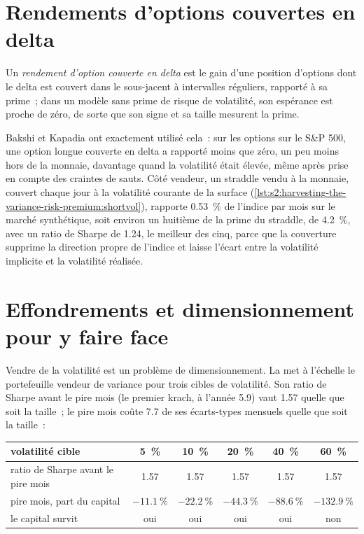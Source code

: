 \section{Rendements d'options couvertes en delta}

\begin{definition}\label{def:s2:harvesting-the-variance-risk-premium:hedged}
Un \emph{rendement d'option couverte en delta} est le gain d'une position d'options dont le delta est couvert dans le sous-jacent à
intervalles réguliers, rapporté à sa prime~; dans un modèle sans prime de risque de volatilité, son espérance est proche de zéro, de sorte que son signe et sa taille mesurent
la prime.
\end{definition}

Bakshi et Kapadia ont exactement utilisé cela~: sur les options sur le S\&P 500, une option longue couverte en delta a rapporté moins que zéro, un peu moins hors de la monnaie, davantage quand
la volatilité était élevée, même après prise en compte des craintes de sauts. Côté vendeur, un straddle vendu à la monnaie, couvert chaque jour à la volatilité
courante de la surface (\cref{lst:s2:harvesting-the-variance-risk-premium:shortvol}), rapporte 0.53~\% de l'indice par mois sur le marché synthétique, soit environ un huitième de la
prime du straddle, de 4.2~\%, avec un ratio de Sharpe de 1.24, le meilleur des cinq, parce que la couverture supprime la direction propre de l'indice et laisse l'écart entre
la volatilité implicite et la volatilité réalisée.

\section{Effondrements et dimensionnement pour y faire face}

Vendre de la volatilité est un problème de dimensionnement. La  met à l'échelle le portefeuille vendeur de variance pour trois cibles de
volatilité. Son ratio de Sharpe avant le pire mois (le premier krach, à l'année 5.9) vaut 1.57 quelle que soit la taille~; le pire mois coûte 7.7 de ses écarts-types
mensuels quelle que soit la taille~:

\begin{center}
\small
\begin{tabular}{@{}lccccc@{}}
\toprule
volatilité cible & 5~\% & 10~\% & 20~\% & 40~\% & 60~\%\\
\midrule
ratio de Sharpe avant le pire mois & 1.57 & 1.57 & 1.57 & 1.57 & 1.57\\
pire mois, part du capital & $-11.1~\%$ & $-22.2~\%$ & $-44.3~\%$ & $-88.6~\%$ & $-132.9~\%$\\
le capital survit & oui & oui & oui & oui & non\\
\bottomrule
\end{tabular}
\end{center}

